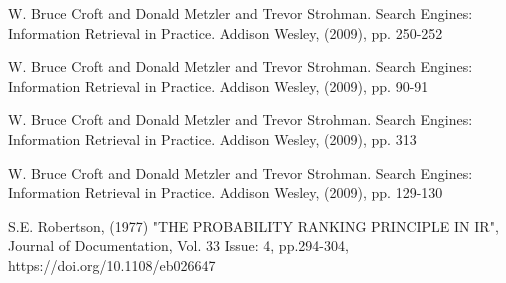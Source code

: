 \documentclass[runningheads]{llncs}
\begin{document}
%

\begin{thebibliography}{8}

W. Bruce Croft and Donald Metzler and Trevor Strohman. Search Engines: Information Retrieval in Practice. Addison Wesley, (2009), pp. 250-252

W. Bruce Croft and Donald Metzler and Trevor Strohman. Search Engines: Information Retrieval in Practice. Addison Wesley, (2009), pp. 90-91

W. Bruce Croft and Donald Metzler and Trevor Strohman. Search Engines: Information Retrieval in Practice. Addison Wesley, (2009), pp. 313

W. Bruce Croft and Donald Metzler and Trevor Strohman. Search Engines: Information Retrieval in Practice. Addison Wesley, (2009), pp. 129-130

S.E. Robertson, (1977) "THE PROBABILITY RANKING PRINCIPLE IN IR", Journal of Documentation, Vol. 33 Issue: 4, pp.294-304, https://doi.org/10.1108/eb026647

\end{thebibliography}

\begin{figure}[h!]
\end{figure}
\end{document}
